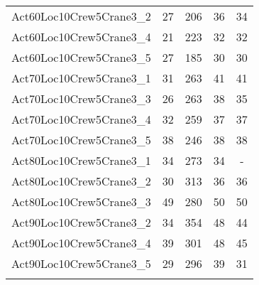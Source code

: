 \begin{center}
\begin{longtable}{ | l | c | c | c | c | }
Act60Loc10Crew5Crane3\_2	&	27	&	206	&	36	&	34	\\
Act60Loc10Crew5Crane3\_4	&	21	&	223	&	32	&	32	\\
Act60Loc10Crew5Crane3\_5	&	27	&	185	&	30	&	30	\\
Act70Loc10Crew5Crane3\_1	&	31	&	263	&	41	&	41	\\
Act70Loc10Crew5Crane3\_3	&	26	&	263	&	38	&	35	\\
Act70Loc10Crew5Crane3\_4	&	32	&	259	&	37	&	37	\\
Act70Loc10Crew5Crane3\_5	&	38	&	246	&	38	&	38	\\
Act80Loc10Crew5Crane3\_1	&	34	&	273	&	34	&	-	\\
Act80Loc10Crew5Crane3\_2	&	30	&	313	&	36	&	36	\\
Act80Loc10Crew5Crane3\_3	&	49	&	280	&	50	&	50	\\
Act90Loc10Crew5Crane3\_2	&	34	&	354	&	48	&	44	\\
Act90Loc10Crew5Crane3\_4	&	39	&	301	&	48	&	45	\\
Act90Loc10Crew5Crane3\_5	&	29	&	296	&	39	&	31	\\
\hline										
\label{tab:solutionSSTFAARF100s}								
\end{longtable}				
\end{center}

